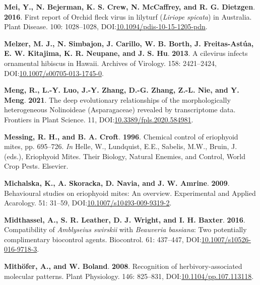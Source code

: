 \documentclass[12pt,final,CPage]{ufthesis}
\newlength{\cslhangindent}
\newenvironment{CSLReferences}[2] %
{%
	\setlength{\parindent}{0pt}
	\ifodd #1 \everypar{\setlength{\hangindent}{\cslhangindent}}\ignorespaces\fi
	\ifnum #2 > 0
	\setlength{\parskip}{#2\baselineskip}
	\fi
}%
{}
\begin{document}
{\begin{CSLReferences}{1}{0}
  \leavevmode{}%
  \textbf{Mei, Y., N. Bejerman, K. S. Crew, N. McCaffrey, and R. G. Dietzgen}. \textbf{2016}. First report of {Orchid fleck virus} in lilyturf {(\emph{Liriope spicata})} in {Australia}. Plant Disease. 100: 1028--1028, DOI:\href{https://doi.org/10.1094/pdis-10-15-1205-pdn}{10.1094/pdis-10-15-1205-pdn}.

  \leavevmode{}%
  \textbf{Melzer, M. J., N. Simbajon, J. Carillo, W. B. Borth, J. Freitas-Astúa, E. W. Kitajima, K. R. Neupane, and J. S. Hu}. \textbf{2013}. A cilevirus infects ornamental hibiscus in {Hawaii}. Archives of Virology. 158: 2421--2424, DOI:\href{https://doi.org/10.1007/s00705-013-1745-0}{10.1007/s00705-013-1745-0}.

  \leavevmode{}%
  \textbf{Meng, R., L.-Y. Luo, J.-Y. Zhang, D.-G. Zhang, Z.-L. Nie, and Y. Meng}. \textbf{2021}. The deep evolutionary relationships of the morphologically heterogeneous {Nolinoideae} ({Asparagaceae}) revealed by transcriptome data. Frontiers in Plant Science. 11, DOI:\href{https://doi.org/10.3389/fpls.2020.584981}{10.3389/fpls.2020.584981}.

  \leavevmode{}%
  \textbf{Messing, R. H., and B. A. Croft}. \textbf{1996}. Chemical control of eriophyoid mites, pp. 695--726. \emph{In} Helle, W., Lundquist, E.E., Sabelis, M.W., Bruin, J. (eds.), Eriophyoid Mites. Their Biology, Natural Enemies, and Control, World Crop Pests. Elsevier.

  \leavevmode{}%
  \textbf{Michalska, K., A. Skoracka, D. Navia, and J. W. Amrine}. \textbf{2009}. Behavioural studies on eriophyoid mites: An overview. Experimental and Applied Acarology. 51: 31--59, DOI:\href{https://doi.org/10.1007/s10493-009-9319-2}{10.1007/s10493-009-9319-2}.

  \leavevmode{}%
  \textbf{Midthassel, A., S. R. Leather, D. J. Wright, and I. H. Baxter}. \textbf{2016}. Compatibility of {\emph{Amblyseius swirskii}} with {\emph{Beauveria bassiana}}: Two potentially complimentary biocontrol agents. Biocontrol. 61: 437--447, DOI:\href{https://doi.org/10.1007/s10526-016-9718-3}{10.1007/s10526-016-9718-3}.

  \leavevmode{}%
  \textbf{Mithöfer, A., and W. Boland}. \textbf{2008}. Recognition of herbivory-associated molecular patterns. Plant Physiology. 146: 825--831, DOI:\href{https://doi.org/10.1104/pp.107.113118}{10.1104/pp.107.113118}.


\end{CSLReferences}}
\end{document}
